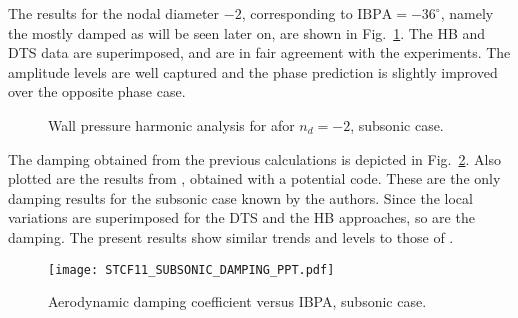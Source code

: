 The results for the  nodal  diameter $-2$, corresponding to $\text{IBPA}=-36^\circ$, namely
the mostly damped as will be seen later on, are shown
in Fig.~\ref{fig:stcf11_ael_subsonic_ibpa_324_paper}. The HB and DTS data
are superimposed, and are in fair agreement with the experiments. The
amplitude levels are well captured and the phase prediction is
slightly improved over the opposite phase case.
\begin{figure}[htp]
  \centering
  \caption{Wall pressure harmonic analysis for afor \mbox{$n_d=-2$}, subsonic case.}
  \label{fig:stcf11_ael_subsonic_ibpa_324_paper}
\end{figure}

The damping obtained from the previous calculations is depicted 
in Fig.~\ref{fig:stcf11_subsonic_damping}.  Also plotted are the results
from \citet{Fransson1999}, obtained with a
potential code.
These are the only damping results for the
subsonic case known by the authors.  Since the local variations are
superimposed for the DTS and the HB approaches, so are the damping.
The present
results show similar trends and levels to those of \citet{Fransson1999}.
\begin{figure}[htp]
  \centering
  \texttt{[image: STCF11\_SUBSONIC\_DAMPING\_PPT.pdf]}
  \caption{Aerodynamic damping coefficient versus IBPA, subsonic case.}
  \label{fig:stcf11_subsonic_damping}
\end{figure}